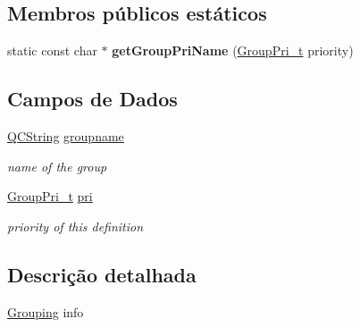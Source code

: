 \subsection*{Membros públicos estáticos}
\begin{DoxyCompactItemize}
\item 
\hypertarget{struct_grouping_a77a963a02fdbcb486b2a9d322b8c8113}{static const char $\ast$ {\bfseries get\-Group\-Pri\-Name} (\hyperlink{struct_grouping_ae0be00a2b5dfbbc6c4558e88dddc9d81}{Group\-Pri\-\_\-t} priority)}\label{struct_grouping_a77a963a02fdbcb486b2a9d322b8c8113}

\end{DoxyCompactItemize}
\subsection*{Campos de Dados}
\begin{DoxyCompactItemize}
\item 
\hypertarget{struct_grouping_a579c9909db32b370557bc85e357d2714}{\hyperlink{class_q_c_string}{Q\-C\-String} \hyperlink{struct_grouping_a579c9909db32b370557bc85e357d2714}{groupname}}\label{struct_grouping_a579c9909db32b370557bc85e357d2714}

\begin{DoxyCompactList}\small\item\em name of the group \end{DoxyCompactList}\item 
\hypertarget{struct_grouping_aab16c1a638f5ca9bb1a3528ee96c2229}{\hyperlink{struct_grouping_ae0be00a2b5dfbbc6c4558e88dddc9d81}{Group\-Pri\-\_\-t} \hyperlink{struct_grouping_aab16c1a638f5ca9bb1a3528ee96c2229}{pri}}\label{struct_grouping_aab16c1a638f5ca9bb1a3528ee96c2229}

\begin{DoxyCompactList}\small\item\em priority of this definition \end{DoxyCompactList}\end{DoxyCompactItemize}


\subsection{Descrição detalhada}
\hyperlink{struct_grouping}{Grouping} info 

